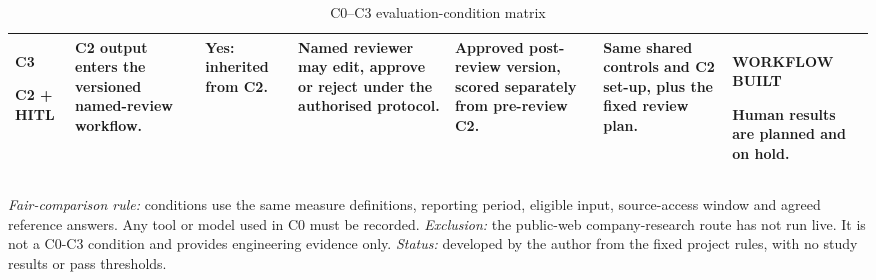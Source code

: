 \begin{table}[p]
\begin{tabularx}{\textwidth}{@{}P{0.12\textwidth}P{0.155\textwidth}P{0.125\textwidth}P{0.10\textwidth}P{0.115\textwidth}Y P{0.172\textwidth}@{}}
    \addlinespace[2pt]
    \textbf{C3}\par C2 + HITL &
    C2 output enters the versioned named-review workflow. &
    Yes: inherited from C2. &
    Named reviewer may edit, approve or reject under the authorised protocol. &
    Approved post-review version, scored separately from pre-review C2. &
    Same shared controls and C2 set-up, plus the fixed review plan. &
    \textbf{WORKFLOW BUILT}\par Human results are planned and on hold. \\
    \bottomrule
  \end{tabularx}

  \caption{C0--C3 evaluation-condition matrix}
  \label{tab:meth-condition-matrix}

  \vspace{5pt}
  \parbox{\textwidth}{\scriptsize
    \textit{Fair-comparison rule:} conditions use the same measure definitions, reporting period,
    eligible input, source-access window and agreed reference answers. Any tool or model used in C0
    must be recorded. \textit{Exclusion:} the public-web company-research route has not run live. It
    is not a C0-C3 condition and provides engineering evidence only. \textit{Status:} developed by
    the author from the fixed project rules, with no study results or pass thresholds.}
\end{table}
\clearpage
